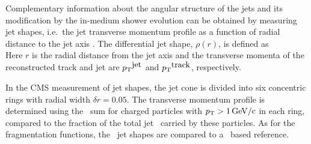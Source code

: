Complementary information about the angular structure of the jets and its modification
by the in-medium shower evolution can be obtained by measuring jet shapes, i.e.\ the 
jet transverse momentum profile as a function of radial distance to the jet axis
\cite{MehtarTani:2010ma,Idilbi:2008vm,CasalderreySolana:2011rz,CasalderreySolana:2011rq,Neufeld:2011yh,Blaizot:2012fh,Fickinger:2013xwa}. 
The differential jet shape, $\rho(r)$, is defined as
\begin{equation}
\label{eq:rho(r)}
\end{equation}
Here $r$ is the radial distance from the jet axis
and the transverse momenta of the reconstructed track and jet are 
$\mbox{$p_{\mathrm{T}}$}^{\mbox{jet}}$ and $\mbox{$p_{\mathrm{T}}$}^{\mbox{track}}$, respectively.

In the CMS measurement of jet shapes, the jet cone is divided into six concentric rings 
with radial width $\delta r = 0.05$. The transverse momentum profile is determined using
the \pT\ sum for charged particles with $\mbox{$p_{\mathrm{T}}$} > 1\,\mathrm{GeV/c}$ in each ring, compared to 
the fraction of the total jet \pT\ carried by these particles. As for the fragmentation
functions, the \PbPb\ jet shapes are compared to a \pp\ based reference.

